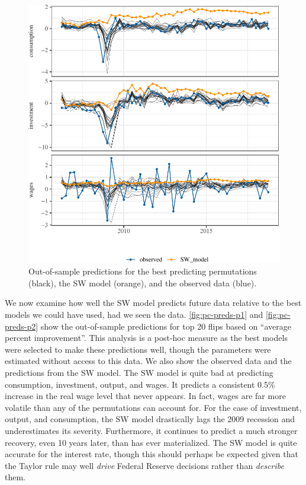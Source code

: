 \documentclass[11pt]{article}
\begin{document}
\begin{figure}[t]

{\centering \includegraphics{gfx/pc-preds-p2-1} 

}

\caption{Out-of-sample predictions for the best predicting permutations (black), the SW model (orange), and the observed data (blue).}\label{fig:pc-preds-p2}
\end{figure}

We now examine how well the SW model predicts future data relative to
the best models we could have used, had we seen the data.
\autoref{fig:pc-preds-p1} and \autoref{fig:pc-preds-p2} show the
out-of-sample predictions for top 20 flips based on ``average percent
improvement''. This analysis is a post-hoc measure as the best models
were selected to make these predictions well, though the parameters were
estimated without access to this data. We also show the observed data
and the predictions from the SW model. The SW model is quite bad at
predicting consumption, investment, output, and wages. It predicts a
consistent 0.5\% increase in the real wage level that never appears. In
fact, wages are far more volatile than any of the permutations can
account for. For the case of investment, output, and consumption, the SW
model drastically lags the 2009 recession and underestimates its
severity. Furthermore, it continues to predict a much stronger recovery,
even 10 years later, than has ever materialized. The SW model is quite
accurate for the interest rate, though this should perhaps be expected
given that the Taylor rule may well \emph{drive} Federal Reserve
decisions rather than \emph{describe} them.
\end{document}
